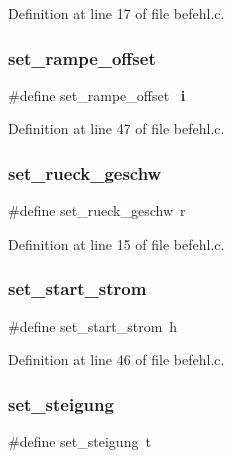Definition at line 17 of file befehl.\+c.

\mbox{\label{befehl_8c_a0f939a5a037b515c2771da907b85d4a9}} 
\subsubsection{set\+\_\+rampe\+\_\+offset}
{\footnotesize\ttfamily \#define set\+\_\+rampe\+\_\+offset~\textquotesingle{}\textbf{ i}\textquotesingle{}}



Definition at line 47 of file befehl.\+c.

\mbox{\label{befehl_8c_abf3c1f147e321dab5f1dabb0b5c341ed}} 
\subsubsection{set\+\_\+rueck\+\_\+geschw}
{\footnotesize\ttfamily \#define set\+\_\+rueck\+\_\+geschw~\textquotesingle{}r\textquotesingle{}}



Definition at line 15 of file befehl.\+c.

\mbox{\label{befehl_8c_a5e17c3c1ed25703b5dbd603f2de9ed2c}} 
\subsubsection{set\+\_\+start\+\_\+strom}
{\footnotesize\ttfamily \#define set\+\_\+start\+\_\+strom~\textquotesingle{}h\textquotesingle{}}



Definition at line 46 of file befehl.\+c.

\mbox{\label{befehl_8c_a3f78b661b34f203131278027ba14ef20}} 
\subsubsection{set\+\_\+steigung}
{\footnotesize\ttfamily \#define set\+\_\+steigung~\textquotesingle{}t\textquotesingle{}}



